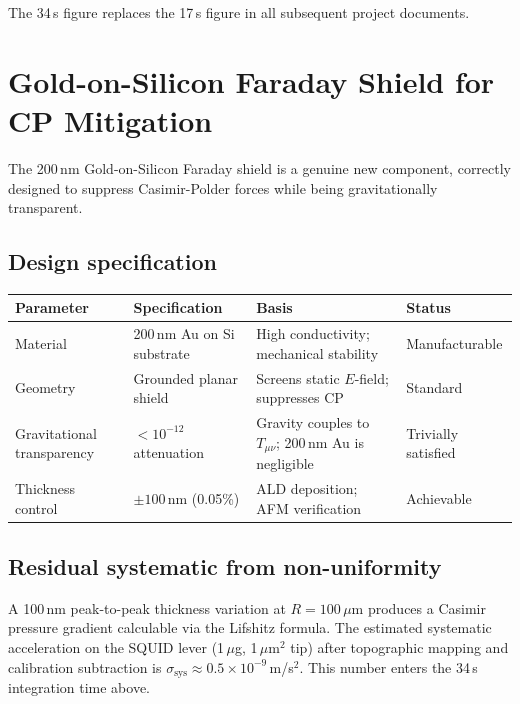 \documentclass[11pt,letterpaper]{article}
\begin{document}
The 34\,s figure replaces the 17\,s figure in all subsequent project documents.

\section{Gold-on-Silicon Faraday Shield for CP Mitigation}

\begin{auditpass}
The 200\,nm Gold-on-Silicon Faraday shield is a genuine new component, correctly
designed to suppress Casimir-Polder forces while being gravitationally transparent.
\end{auditpass}

\subsection{Design specification}

\begin{center}\small
\begin{tabular}{@{}llll@{}}
\toprule
Parameter & Specification & Basis & Status \\
\midrule
Material & 200\,nm Au on Si substrate & High conductivity; mechanical stability & Manufacturable \\
Geometry & Grounded planar shield & Screens static $E$-field; suppresses CP & Standard \\
Gravitational transparency & $<10^{-12}$ attenuation & Gravity couples to $T_{\mu\nu}$; 200\,nm Au is negligible & Trivially satisfied \\
Thickness control & $\pm100$\,nm (0.05\%) & ALD deposition; AFM verification & Achievable \\
\bottomrule
\end{tabular}
\end{center}

\subsection{Residual systematic from non-uniformity}

A 100\,nm peak-to-peak thickness variation at $R = 100\,\mu$m produces a Casimir
pressure gradient calculable via the Lifshitz formula.  The estimated systematic
acceleration on the SQUID lever (1\,$\mu$g, 1\,$\mu$m$^2$ tip) after topographic
mapping and calibration subtraction is $\sigma_{\mathrm{sys}} \approx 0.5\times10^{-9}$\,m/s$^2$.
This number enters the 34\,s integration time above.
\end{document}
